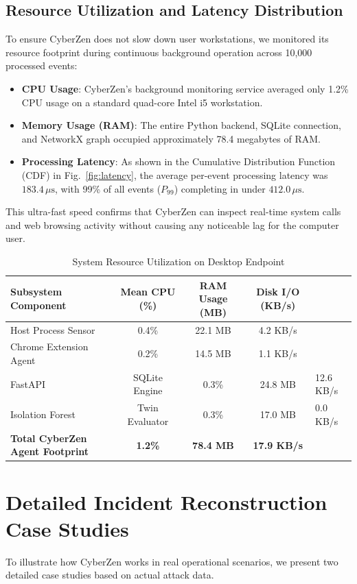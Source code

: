 \documentclass[conference]{IEEEtran}
\begin{document}
\subsection{Resource Utilization and Latency Distribution}
To ensure CyberZen does not slow down user workstations, we monitored its resource footprint during continuous background operation across 10,000 processed events:
\begin{itemize}
    \item \textbf{CPU Usage}: CyberZen's background monitoring service averaged only 1.2\% CPU usage on a standard quad-core Intel i5 workstation.
    \item \textbf{Memory Usage (RAM)}: The entire Python backend, SQLite connection, and NetworkX graph occupied approximately 78.4 megabytes of RAM.
    \item \textbf{Processing Latency}: As shown in the Cumulative Distribution Function (CDF) in Fig.~\ref{fig:latency}, the average per-event processing latency was $183.4\,\mu\text{s}$, with 99\% of all events ($P_{99}$) completing in under $412.0\,\mu\text{s}$.
\end{itemize}
This ultra-fast speed confirms that CyberZen can inspect real-time system calls and web browsing activity without causing any noticeable lag for the computer user.

\begin{table}[h]
\caption{System Resource Utilization on Desktop Endpoint}
\label{tab:resource_usage}
\centering
\begin{tabular}{@{}lccc@{}}
\toprule
\textbf{Subsystem Component} & \textbf{Mean CPU (\%)} & \textbf{RAM Usage (MB)} & \textbf{Disk I/O (KB/s)} \\
\midrule
Host Process Sensor & 0.4\% & 22.1 MB & 4.2 KB/s \\
Chrome Extension Agent & 0.2\% & 14.5 MB & 1.1 KB/s \\
FastAPI & SQLite Engine & 0.3\% & 24.8 MB & 12.6 KB/s \\
Isolation Forest & Twin Evaluator & 0.3\% & 17.0 MB & 0.0 KB/s \\
\midrule
\textbf{Total CyberZen Agent Footprint} & \textbf{1.2\%} & \textbf{78.4 MB} & \textbf{17.9 KB/s} \\
\bottomrule
\end{tabular}
\end{table}

\section{Detailed Incident Reconstruction Case Studies}
To illustrate how CyberZen works in real operational scenarios, we present two detailed case studies based on actual attack data.
\end{document}
